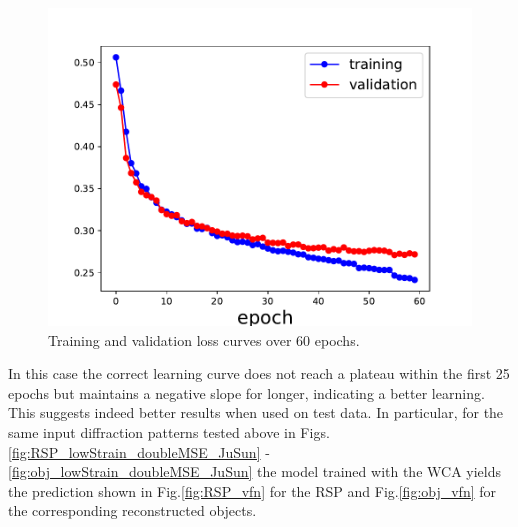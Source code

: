 \begin{figure}[H]
    \centering
    \includegraphics[width=.8\textwidth]{figures/Phasing/loss_low_strain_noiseless_doubleVFN.pdf}
    \caption{Training and validation loss curves over 60 epochs.}
    \label{fig:loss_vfn}
\end{figure}

In this case the correct learning curve does not reach a plateau within the first 25 epochs but maintains a negative slope 
for longer, indicating a better learning. This suggests indeed better results when used on test data. 
In particular, for the same input diffraction patterns tested above in Figs.\ref{fig:RSP_lowStrain_doubleMSE_JuSun} - \ref{fig:obj_lowStrain_doubleMSE_JuSun}
the model trained with the WCA yields the prediction shown in Fig.\ref{fig:RSP_vfn} for the RSP and Fig.\ref{fig:obj_vfn} 
for the corresponding reconstructed objects. 

